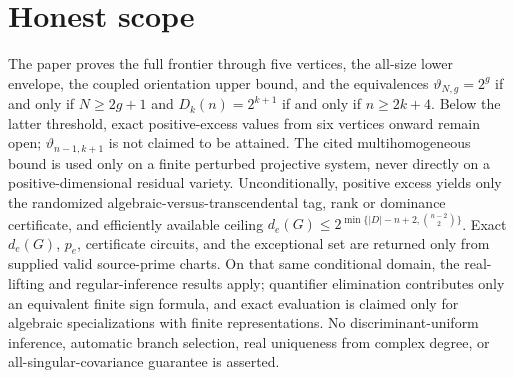 \documentclass{article}
\begin{document}
\section{Honest scope}

The paper proves the full frontier through five vertices, the all-size lower envelope, the coupled orientation upper bound, and the equivalences \(\vartheta_{N,g}=2^g\) if and only if \(N\geq2g+1\) and \(D_k(n)=2^{k+1}\) if and only if \(n\geq2k+4\). Below the latter threshold, exact positive-excess values from six vertices onward remain open; \(\vartheta_{n-1,k+1}\) is not claimed to be attained. The cited multihomogeneous bound is used only on a finite perturbed projective system, never directly on a positive-dimensional residual variety. Unconditionally, positive excess yields only the randomized algebraic-versus-transcendental tag, rank or dominance certificate, and efficiently available ceiling \(d_e(G)\leq2^{\min\{|D|-n+2,\binom{n-2}{2}\}}\). Exact \(d_e(G)\), \(p_e\), certificate circuits, and the exceptional set are returned only from supplied valid source-prime charts. On that same conditional domain, the real-lifting and regular-inference results apply; quantifier elimination contributes only an equivalent finite sign formula, and exact evaluation is claimed only for algebraic specializations with finite representations. No discriminant-uniform inference, automatic branch selection, real uniqueness from complex degree, or all-singular-covariance guarantee is asserted.
\end{document}
